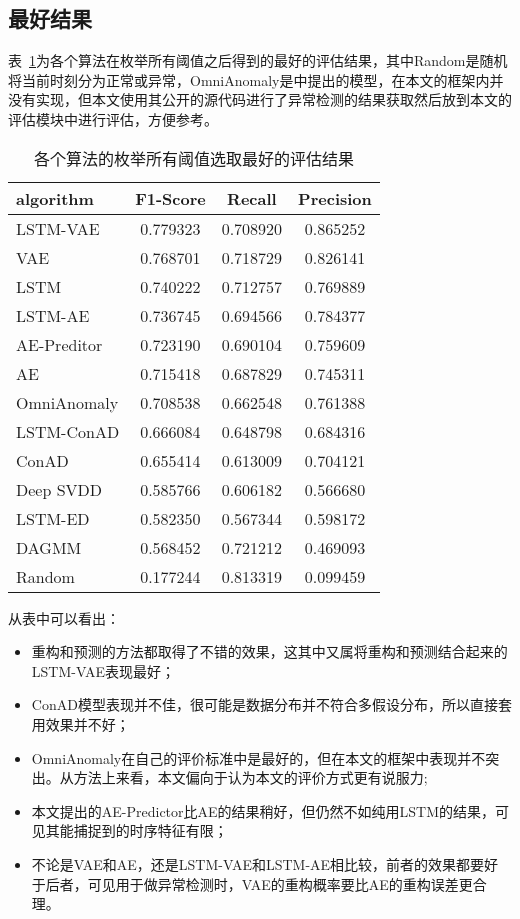 \subsection{最好结果}
表~\ref{tab:best}为各个算法在枚举所有阈值之后得到的最好的评估结果，其中Random是随机将当前时刻分为正常或异常，OmniAnomaly是\cite{su2019robust}中提出的模型，在本文的框架内并没有实现，但本文使用其公开的源代码进行了异常检测的结果获取然后放到本文的评估模块中进行评估，方便参考。
\begin{table}[htbp]
  \centering
\begin{tabular}{lccc}
  \toprule
          algorithm &  F1-Score &    Recall &  Precision \\
  \midrule
   LSTM-VAE &  0.779323 &  0.708920 &   0.865252 \\
        VAE &  0.768701 &  0.718729 &   0.826141 \\
     LSTM &  0.740222 &  0.712757 &   0.769889 \\
            LSTM-AE &  0.736745 &  0.694566 &   0.784377 \\
       AE-Preditor &  0.723190 &  0.690104 &   0.759609 \\
                 AE &  0.715418 &  0.687829 &   0.745311 \\
                 OmniAnomaly &  0.708538 &  0.662548 &   0.761388 \\
         LSTM-ConAD &  0.666084 &  0.648798 &   0.684316 \\
              ConAD &  0.655414 &  0.613009 &   0.704121 \\
          Deep SVDD &  0.585766 &  0.606182 &   0.566680 \\
            LSTM-ED &  0.582350 &  0.567344 &   0.598172 \\
              DAGMM &  0.568452 &  0.721212 &   0.469093 \\
             Random &  0.177244 &  0.813319 &   0.099459 \\
  \bottomrule
  \end{tabular}
  \caption{各个算法的枚举所有阈值选取最好的评估结果}
  \label{tab:best}
\end{table}

从表中可以看出：
\begin{itemize}
  \item 重构和预测的方法都取得了不错的效果，这其中又属将重构和预测结合起来的LSTM-VAE表现最好；
  \item ConAD模型表现并不佳，很可能是数据分布并不符合多假设分布，所以直接套用效果并不好；
  \item OmniAnomaly在自己的评价标准中是最好的，但在本文的框架中表现并不突出。从方法上来看，本文偏向于认为本文的评价方式更有说服力;
  \item 本文提出的AE-Predictor比AE的结果稍好，但仍然不如纯用LSTM的结果，可见其能捕捉到的时序特征有限；
  \item 不论是VAE和AE，还是LSTM-VAE和LSTM-AE相比较，前者的效果都要好于后者，可见用于做异常检测时，VAE的重构概率要比AE的重构误差更合理。
\end{itemize}

